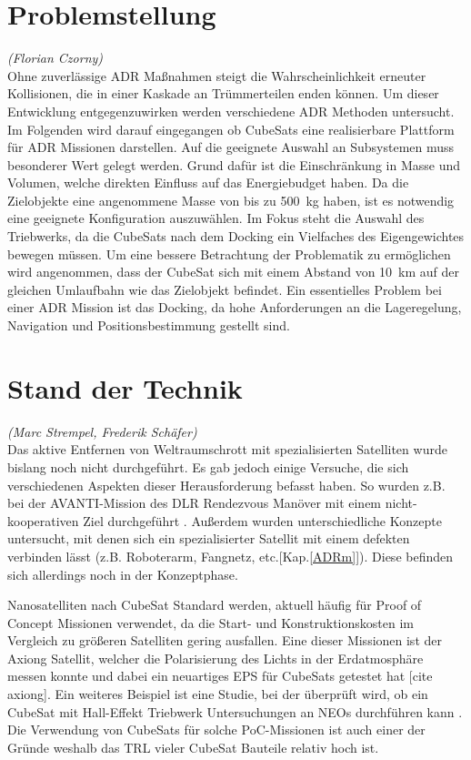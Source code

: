 		\section{Problemstellung}
		\hfill\emph{(Florian Czorny)}\\
Ohne zuverlässige ADR Maßnahmen steigt die Wahrscheinlichkeit erneuter Kollisionen, die in einer Kaskade an Trümmerteilen enden können. Um dieser Entwicklung entgegenzuwirken werden verschiedene ADR Methoden untersucht.
Im Folgenden wird darauf eingegangen ob CubeSats eine realisierbare Plattform für ADR Missionen darstellen.
Auf die geeignete Auswahl an Subsystemen muss besonderer Wert gelegt werden. Grund dafür ist die Einschränkung in Masse und Volumen, welche direkten Einfluss auf das Energiebudget haben. Da die Zielobjekte eine angenommene Masse von bis zu \SI{500}{\kilogram} haben, ist es notwendig eine geeignete Konfiguration auszuwählen. Im Fokus steht die Auswahl des Triebwerks, da die CubeSats nach dem Docking ein Vielfaches des Eigengewichtes bewegen müssen. Um eine bessere Betrachtung der Problematik zu ermöglichen wird angenommen, dass der CubeSat sich mit einem Abstand von \SI{10}{\kilo\metre} auf der gleichen Umlaufbahn wie das Zielobjekt befindet. Ein essentielles Problem bei einer ADR Mission ist das Docking, da hohe Anforderungen an die Lageregelung, Navigation und Positionsbestimmung gestellt sind. 

		\section{Stand der Technik}
		\hfill\emph{(Marc Strempel, Frederik Schäfer)}\\	
Das aktive Entfernen von Weltraumschrott mit spezialisierten Satelliten wurde bislang noch nicht durchgeführt. Es gab jedoch einige Versuche, die sich verschiedenen Aspekten dieser Herausforderung befasst haben. So wurden z.B. bei der AVANTI-Mission des DLR Rendezvous Manöver mit einem nicht-kooperativen Ziel durchgeführt \cite{Gaias.2018,Gaias.2018b}. 
Außerdem wurden unterschiedliche Konzepte untersucht, mit denen sich ein spezialisierter Satellit mit einem defekten verbinden lässt (z.B. Roboterarm, Fangnetz, etc.[Kap.\ref{ADRm}]). Diese befinden sich allerdings noch in der Konzeptphase\cite{Mark.2019}.

Nanosatelliten nach CubeSat Standard werden, aktuell häufig für Proof of Concept Missionen verwendet, da die Start- und Konstruktionskosten im Vergleich zu größeren Satelliten gering ausfallen. Eine dieser Missionen ist der Axiong Satellit, welcher die Polarisierung des Lichts in der Erdatmosphäre messen konnte und dabei ein neuartiges EPS für CubeSats getestet hat [cite axiong]. Ein weiteres Beispiel ist eine Studie, bei der überprüft wird, ob ein CubeSat mit Hall-Effekt Triebwerk Untersuchungen an NEOs durchführen kann \cite{UniversityofStrathclydeGlasgow.2018}. Die Verwendung von CubeSats für solche PoC-Missionen ist auch einer der Gründe weshalb das TRL vieler CubeSat Bauteile relativ hoch ist.



